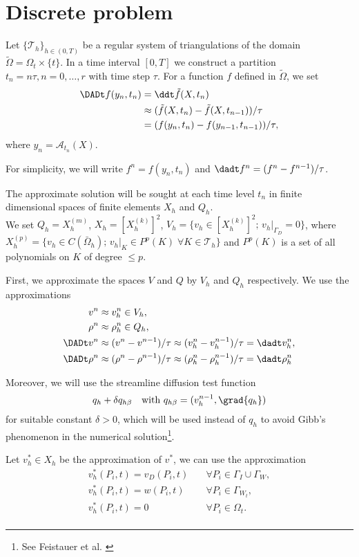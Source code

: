 \section{Discrete problem}

Let $\{\mathcal T_h\}_{h \in (0,T)}$ be a regular system of triangulations of
the domain $\widetilde\Omega=\Omega_t\times\{t\}$. In a time interval $[0,T]$ we construct a
partition
$t_n=n\tau, n=0,\ldots,r$ with time step $\tau$. For a function $f$ defined in 
$\widetilde\Omega$, we set 
\[
\begin{split}
\DADt f(y_n,t_n) &= \ddt\tilde{f}(X,t_n) \\
&\approx(\tilde{f}(X,t_n)-\tilde{f}(X,t_{n-1}))/\tau \\
&= (f(y_n,t_n)-f(y_{n-1},t_{n-1}))/\tau, 
\end{split}
\]
where $y_n=\mathcal A_{t_n}(X)$.

For simplicity, we will write $f^n=f(y_n,t_n)$ and $\dadt
f^n=(f^n-f^{n-1})/\tau$.

The approximate solution will be sought at each time level $t_n$ in finite
dimensional spaces of finite elements $X_h$ and $Q_h$. \\
We set $Q_h=X_h^{(m)}$, $X_h=[X_h^{(k)}]^2$, $V_h=\{v_h \in [X_h^{(k)}]^2;\,
v_h|_{\Gamma_D}=0\}$, where $X_h^{(p)}=\{v_h\in C(\bar{\Omega}_h);\, v_h|_K \in
P^p(K) \;\forall K\in \mathcal T_h \}$ and $P^p(K)$ is a set of all polynomials
on $K$ of degree $\leq p$. 


First, we approximate the spaces $V$ and $Q$ by $V_h$ and $Q_h$ respectively. We
use the approximations 
\[
\begin{split}
v^n &\approx v_h^n \in V_h, \\
\rho^n &\approx \rho_h^n \in Q_h, \\
\DADt v^n &\approx (v^n-v^{n-1})/\tau \approx (v_h^n-v_h^{n-1})/\tau = \dadt
v_h^n, \\
\DADt \rho^n &\approx (\rho^n-\rho^{n-1})/\tau \approx
(\rho_h^n-\rho_h^{n-1})/\tau = \dadt \rho_h^n 
\end{split}
\]

Moreover, we will use the streamline diffusion test function 
$$q_h+\delta q_{h\beta} \quad \mbox{with } q_{h\beta}=(v_h^{n-1},\grad{q_h})$$ 
for suitable constant $\delta>0$, which will be used instead of $q_h$ to avoid
Gibb's phenomenon in the numerical solution\footnote{See Feistauer et al.
\cite[p. 346]{feistauer}}. 

Let $v_h^* \in X_h$ be the approximation of $v^*$, we can use the approximation 
\[
\begin{array}{ll}
v_h^*(P_i,t)=v_D(P_i,t) \quad &\forall P_i\in\Gamma_I\cup\Gamma_W, \\
v_h^*(P_i,t)=w(P_i,t) \quad &\forall P_i\in\Gamma_{W_t}, \\
v_h^*(P_i,t)=0 \quad &\forall P_i\in\Omega_t. \\
\end{array}
\]


